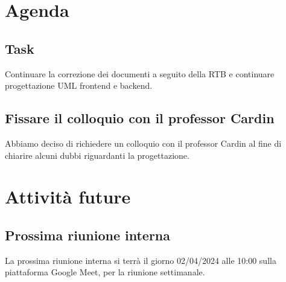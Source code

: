 \documentclass{article}
\begin{document}
\section{Agenda}
\subsection{Task}
Continuare la correzione dei documenti a seguito della RTB e continuare progettazione UML frontend e backend. 
\subsection{Fissare il colloquio con il professor Cardin}
Abbiamo deciso di richiedere un colloquio con il professor Cardin al fine di chiarire alcuni dubbi riguardanti la progettazione.

\section{Attività future}
\subsection{Prossima riunione interna}
La prossima riunione interna si terrà il giorno 02/04/2024 alle 10:00 sulla piattaforma Google Meet, per la riunione settimanale.
\end{document}
